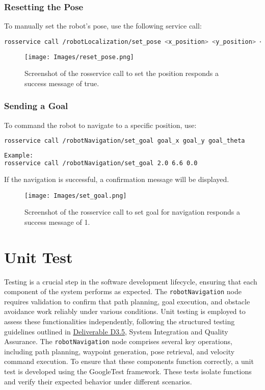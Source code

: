 \documentclass{CSSRforAfrica}
\begin{document}
\subsubsection*{Resetting the Pose}
To manually set the robot’s pose, use the following service call:
\begin{lstlisting}[style=withoutNumbering, language=bash]
rosservice call /robotLocalization/set_pose <x_position> <y_position> <theta>
\end{lstlisting}
\begin{figure}[H]
    \centering
    \texttt{[image: Images/reset\_pose.png]}
    \caption{Screenshot of the rosservice call to set the position responds a success message of true.}
    \label{fig:reset_pose}
\end{figure}
\subsubsection*{Sending a Goal}
To command the robot to navigate to a specific position, use:
\begin{lstlisting}[style=withoutNumbering, language=bash]
rosservice call /robotNavigation/set_goal goal_x goal_y goal_theta
\end{lstlisting}
\begin{lstlisting}[style=withoutNumbering, language=bash]
Example:
rosservice call /robotNavigation/set_goal 2.0 6.6 0.0
\end{lstlisting}
If the navigation is successful, a confirmation message will be displayed.
\begin{figure}[H]
    \centering
    \texttt{[image: Images/set\_goal.png]}
    \caption{Screenshot of the rosservice call to set goal for navigation responds a success message of 1.}
    \label{fig:set_goal}
\end{figure}

\newpage
\section{Unit Test}
Testing is a crucial step in the software development lifecycle, ensuring that each component of the system performs as expected. The \verb|robotNavigation| node requires validation to confirm that path planning, goal execution, and obstacle avoidance work reliably under various conditions. Unit testing is employed to assess these functionalities independently, following the structured testing guidelines outlined in \href{https://cssr4africa.github.io/deliverables/CSSR4Africa_Deliverable_D3.5.pdf}{Deliverable D3.5}, System Integration and Quality Assurance.
The \verb|robotNavigation| node comprises several key operations, including path planning, waypoint generation, pose retrieval, and velocity command execution. To ensure that these components function correctly, a unit test is developed using the GoogleTest framework. These tests isolate functions and verify their expected behavior under different scenarios.
\end{document}
